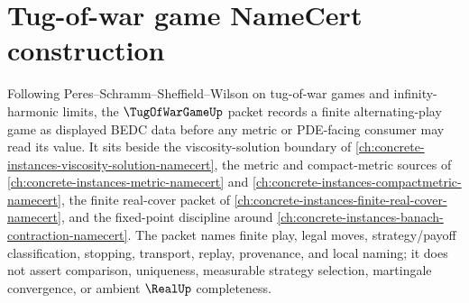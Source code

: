 \chapter{Tug-of-war game NameCert construction}
\label{ch:concrete-instances-tug-of-war-game-namecert}

Following Peres--Schramm--Sheffield--Wilson on tug-of-war games and infinity-harmonic limits, the $\TugOfWarGameUp$ packet records a finite alternating-play game as displayed BEDC data before any metric or PDE-facing consumer may read its value. It sits beside the viscosity-solution boundary of \autoref{ch:concrete-instances-viscosity-solution-namecert}, the metric and compact-metric sources of \autoref{ch:concrete-instances-metric-namecert} and \autoref{ch:concrete-instances-compactmetric-namecert}, the finite real-cover packet of \autoref{ch:concrete-instances-finite-real-cover-namecert}, and the fixed-point discipline around \autoref{ch:concrete-instances-banach-contraction-namecert}. The packet names finite play, legal moves, strategy/payoff classification, stopping, transport, replay, provenance, and local naming; it does not assert comparison, uniqueness, measurable strategy selection, martingale convergence, or ambient $\RealUp$ completeness.

